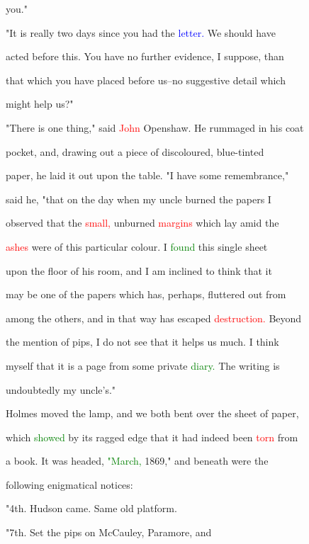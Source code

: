  you."



 "It is really two days since you had the \textcolor{blue}{letter.} We should have

 acted before this. You have no further evidence, I suppose, than

 that which you have placed before us--no suggestive detail which

 might help us?"



 "There is one thing," said \textcolor{red}{John} Openshaw. He rummaged in his coat

 pocket, and, drawing out a piece of discoloured, blue-tinted

 paper, he laid it out upon the table. "I have some remembrance,"

 said he, "that on the day when my uncle burned the papers I

 observed that the \textcolor{red}{small,} unburned \textcolor{red}{margins} which lay amid the

 \textcolor{red}{ashes} were of this particular colour. I \textcolor{green}{found} this single sheet

 upon the floor of his room, and I am inclined to think that it

 may be one of the papers which has, perhaps, fluttered out from

 among the others, and in that way has \textcolor{BurntOrange}{escaped} \textcolor{red}{destruction.} Beyond

 the mention of pips, I do not see that it helps us much. I think

 myself that it is a page from some private \textcolor{green}{diary.} The writing is

 undoubtedly my uncle's."



 Holmes moved the lamp, and we both bent over the sheet of paper,

 which \textcolor{green}{showed} by its ragged edge that it had indeed been \textcolor{red}{torn} from

 a book. It was headed, \textcolor{green}{"March,} 1869," and beneath were the

 following enigmatical notices:



 "4th. Hudson came. Same old platform.



 "7th. Set the pips on McCauley, Paramore, and

